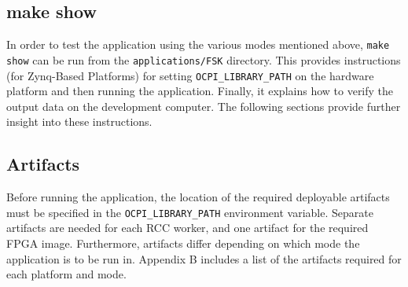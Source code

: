 \subsection{make show}
In order to test the application using the various modes mentioned above, \texttt{make show} can be run from the \texttt{applications/FSK} directory. This provides instructions (for Zynq-Based Platforms) for setting \texttt{OCPI\_LIBRARY\_PATH} on the hardware platform and then running the application. Finally, it explains how to verify the output data on the development computer. The following sections provide further insight into these instructions.
\subsection{Artifacts}
Before running the application, the location of the required deployable artifacts must be specified in the \texttt{OCPI\_LIBRARY\_PATH} environment variable. Separate artifacts are needed for each RCC worker, and one artifact for the required FPGA image. Furthermore, artifacts differ depending on which mode the application is to be run in. Appendix B includes a list of the artifacts required for each platform and mode.
